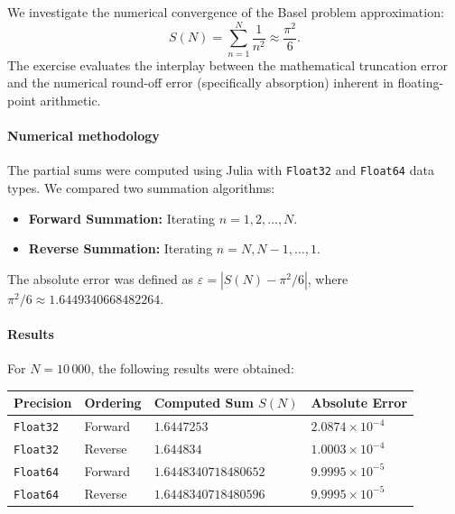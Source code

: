 \begin{solution}
    We investigate the numerical convergence of the Basel problem approximation:
    \[
        S(N) = \sum_{n=1}^{N} \frac{1}{n^2} \approx \frac{\pi^2}{6}.
    \]
    The exercise evaluates the interplay between the mathematical truncation error and the numerical round-off error (specifically absorption) inherent in floating-point arithmetic.

    \paragraph{Numerical methodology}
    The partial sums were computed using Julia with \texttt{Float32} and \texttt{Float64} data types. We compared two summation algorithms:
    \begin{itemize}
        \item \textbf{Forward Summation:} Iterating $n = 1, 2, \ldots, N$.
        \item \textbf{Reverse Summation:} Iterating $n = N, N-1, \ldots, 1$.
    \end{itemize}
    The absolute error was defined as $\varepsilon = |S(N) - \pi^2/6|$, where $\pi^2/6 \approx 1.6449340668482264$.

    \paragraph{Results}
    For $N = 10\,000$, the following results were obtained:

    \begin{center}
    \centering
    \label{tab:results}
    \begin{tabular}{l l l l}
    \hline
    \textbf{Precision} & \textbf{Ordering} & \textbf{Computed Sum} $S(N)$ & \textbf{Absolute Error} \\ \hline
    \texttt{Float32}   & Forward           & $1.6447253$                 & $2.0874 \times 10^{-4}$ \\
    \texttt{Float32}   & Reverse           & $1.644834$                  & $1.0003 \times 10^{-4}$ \\ \hline
    \texttt{Float64}   & Forward           & $1.6448340718480652$        & $9.9995 \times 10^{-5}$ \\
    \texttt{Float64}   & Reverse           & $1.6448340718480596$        & $9.9995 \times 10^{-5}$ \\ \hline
    \end{tabular}
    \end{center}


\end{solution}
